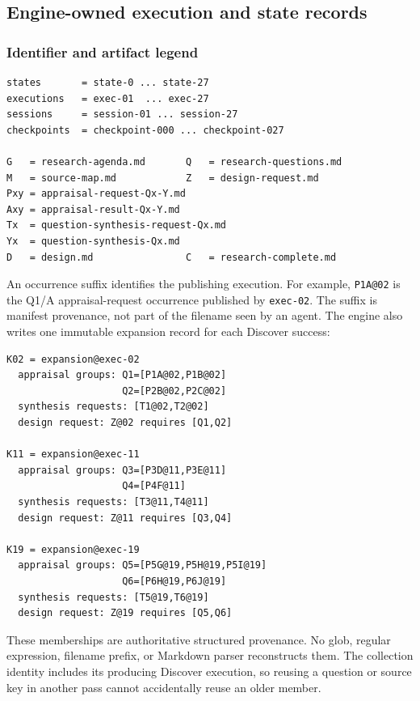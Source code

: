 \documentclass[11pt]{article}
\begin{document}
\subsection{Engine-owned execution and state records}

\subsubsection{Identifier and artifact legend}

\begin{lstlisting}[style=playbook]
states       = state-0 ... state-27
executions   = exec-01  ... exec-27
sessions     = session-01 ... session-27
checkpoints  = checkpoint-000 ... checkpoint-027

G   = research-agenda.md       Q   = research-questions.md
M   = source-map.md            Z   = design-request.md
Pxy = appraisal-request-Qx-Y.md
Axy = appraisal-result-Qx-Y.md
Tx  = question-synthesis-request-Qx.md
Yx  = question-synthesis-Qx.md
D   = design.md                C   = research-complete.md
\end{lstlisting}

An occurrence suffix identifies the publishing execution. For example,
\texttt{P1A@02} is the Q1/A appraisal-request occurrence published by
\texttt{exec-02}. The suffix is manifest provenance, not part of the filename
seen by an agent. The engine also writes one immutable expansion record for
each Discover success:

\begin{lstlisting}[style=playbook,basicstyle=\ttfamily\scriptsize]
K02 = expansion@exec-02
  appraisal groups: Q1=[P1A@02,P1B@02]
                    Q2=[P2B@02,P2C@02]
  synthesis requests: [T1@02,T2@02]
  design request: Z@02 requires [Q1,Q2]

K11 = expansion@exec-11
  appraisal groups: Q3=[P3D@11,P3E@11]
                    Q4=[P4F@11]
  synthesis requests: [T3@11,T4@11]
  design request: Z@11 requires [Q3,Q4]

K19 = expansion@exec-19
  appraisal groups: Q5=[P5G@19,P5H@19,P5I@19]
                    Q6=[P6H@19,P6J@19]
  synthesis requests: [T5@19,T6@19]
  design request: Z@19 requires [Q5,Q6]
\end{lstlisting}

These memberships are authoritative structured provenance. No glob, regular
expression, filename prefix, or Markdown parser reconstructs them. The
collection identity includes its producing Discover execution, so reusing a
question or source key in another pass cannot accidentally reuse an older
member.
\end{document}

